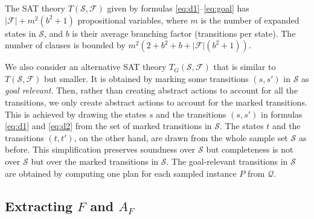 \documentclass[letterpaper]{article} %
\newcommand{\Omit}[1]{}
\newcommand{\Q}{\mathcal{Q}}
\newcommand{\F}{\mathcal{F}}
\renewcommand{\S}{\mathcal{S}}
\begin{document}
\medskip

The SAT theory $T(\S,\F)$ given by formulas \eqref{eq:d1}--\eqref{eq:goal}
has  $|\F| + m^2 (b^2 + 1)$ propositional variables,
where $m$ is the number of expanded states in $\S$, and $b$ is their average branching factor (transitions per state).
The number of clauses is bounded by $m^2(2 + b^2 + b + |\F|(b^2 + 1))$. %
%
\Omit{
This means  that  $50$ expanded states in the sample set
with an average branching factor of $10$, and a set $\F$
with $400$ candidate features, can generate up to $10^8$ clauses.
While this is a loose upper bound for the number of clauses that
follow from the implication   $D_2(s, s', t, t') \Leftharrow\ \textstyle\bigvee_f  selected(f)$
in (\label{eq:d2}) and the numbers are further reduced by symmetry consideration,
this is still a large number. ..
}
%

We also consider an alternative SAT theory $T_G(\S,\F)$ that is similar to $T(\S,\F)$
but  smaller. It is obtained by marking  some transitions $(s,s')$ in $\S$  as  \emph{goal relevant}.
Then, rather than creating abstract  actions to account for all the transitions, we only create
abstract actions to account for the marked transitions. This is achieved by drawing the states
$s$ and the transitions $(s,s')$ in formulas \eqref{eq:d1} and \eqref{eq:d2} from the
set of marked transitions in $\S$. The states $t$ and the transitions $(t,t')$, on the other hand,
are drawn from the whole sample set $\S$ as before. This simplification preserves soundness over $\S$
but completeness is not over $\S$ but over the marked transitions in $\S$.
The goal-relevant transitions in $\S$ are obtained by computing one plan
for each sampled instance $P$ from $\Q$.

\Omit{
If the set of marked transitions is much smaller than the full sample set, %
$T_G(\S,\F)$ is much smaller than $T(\S,\F)$.
$T_G(\S,\F)$ guarantees soundness relative to $\S$
but completeness only relative to the subset of goal-relevant transitions in $\S$.
Yet this does not affect the resulting formal guarantees, which depend only on soundness.
}


\subsection{Extracting $F$ and  $A_F$}
\end{document}
